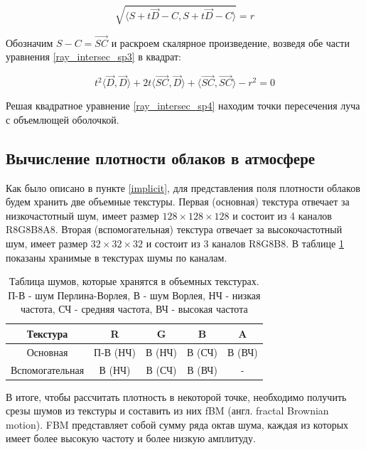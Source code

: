 \begin{equation}
	\label{ray_intersec_sp3}
	\sqrt{\langle S + t \vec{D} - C , S + t \vec{D} - C \rangle} = r
\end{equation}

Обозначим $ S - C = \vec{SC} $ и раскроем скалярное произведение, возведя обе части уравнения \eqref{ray_intersec_sp3} в квадрат:

\begin{equation}
	\label{ray_intersec_sp4}
	t ^ 2 \langle \vec{D}, \vec{D} \rangle + 2t \langle \vec{SC}, \vec{D} \rangle + \langle \vec{SC}, \vec{SC} \rangle - r ^ 2 = 0
\end{equation}

Решая квадратное уравнение \eqref{ray_intersec_sp4} находим точки пересечения луча с объемлющей оболочкой.

\subsection{Вычисление плотности облаков в атмосфере}

Как было описано в пункте \ref{implicit}, для представления поля плотности облаков будем хранить две объемные текстуры.
Первая (основная) текстура отвечает за низкочастотный шум, имеет размер $ 128 \times 128 \times 128 $ и состоит из 4 каналов R8G8B8A8. Вторая (вспомогательная) текстура отвечает за высокочастотный шум, имеет размер $ 32 \times 32 \times 32 $ и состоит из 3 каналов R8G8B8. 
В таблице \ref{tab:textures} показаны хранимые в текстурах шумы по каналам.

\begin{table}[b]
	\begin{center}
\begin{tabular}{|c|c|c|c|c|}
	\hline
	Текстура & R & G & B & A\\
	\hline
	Основная & П-В (НЧ) & В (НЧ) & В (СЧ) & В (ВЧ)\\
	\hline
	Вспомогательная & В (НЧ) & В (СЧ) & В (ВЧ) & -\\
	\hline
\end{tabular}
\end{center}
\caption{Таблица шумов, которые хранятся в объемных текстурах. П-В - шум Перлина-Ворлея, В - шум Ворлея, НЧ - низкая частота, СЧ - средняя частота, ВЧ - высокая частота}
\label{tab:textures}
\end{table}

В итоге, чтобы рассчитать плотность в некоторой точке, необходимо получить срезы шумов из текстуры и составить из них fBM (англ. fractal Brownian motion). FBM представляет собой сумму ряда октав шума, каждая из которых имеет более высокую частоту и более низкую амплитуду.


